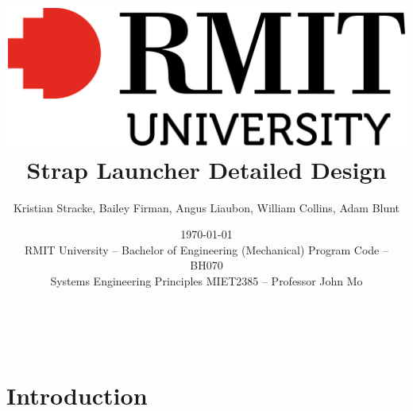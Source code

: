 \documentclass[a4paper,10pt]{article}
\begin{document}
    \fancyhf{}
    \renewcommand{\headrulewidth}{0pt}
    \pagestyle{fancy}

\newenvironment{FRpage}{%
  \clearpage
  \begin{landscape}
  \thispagestyle{plain}
  \begingroup
  \footnotesize
  \setlength{\tabcolsep}{3.5pt} %
}{%
  \endgroup
  \end{landscape}
  \clearpage
}


\author{Kristian Stracke, Bailey Firman, Angus Liaubon, William Collins, Adam Blunt}\\
\date{\today\\[2ex]
RMIT University – Bachelor of Engineering (Mechanical) Program Code – BH070 \\
\bigskip
Systems Engineering Principles MIET2385 – Professor John Mo}


\title{\includegraphics*[scale=0.1]{rmit-university-logo.png} \\[14ex] \textbf{Strap Launcher Detailed Design}} %

\maketitle
\thispagestyle{empty}
\newpage

\tableofcontents
\listoftables
\listoffigures
\setcounter{page}{1}

\justifying




\newpage

\section{Introduction}
\end{document}
